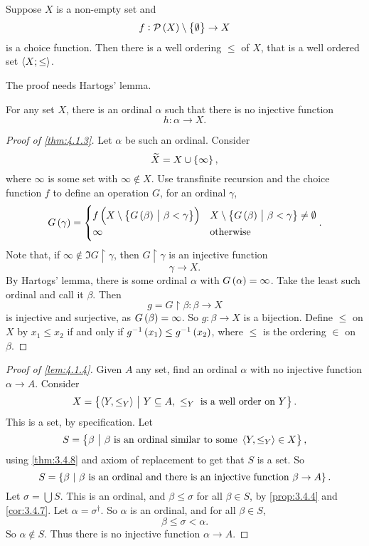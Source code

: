 \begin{theorem}
\label{thm:4.1.3}
Suppose $ X $ is a non-empty set and
$$ f : \PPP\br{X} \setminus \cbr{\emptyset} \to X $$
is a choice function. Then there is a well ordering $ \le $ of $ X $, that is a well ordered set $ \left\langle X; \le \right\rangle $.
\end{theorem}

The proof needs Hartogs' lemma.

\begin{lemma}
\label{lem:4.1.4}
For any set $ X $, there is an ordinal $ \alpha $ such that there is no injective function
$$ h : \alpha \to X. $$
\end{lemma}

\begin{proof}[Proof of \ref{thm:4.1.3}]
Let $ \alpha $ be such an ordinal. Consider
$$ \widetilde{X} = X \cup \cbr{\infty}, $$
where $ \infty $ is some set with $ \infty \notin X $. Use transfinite recursion and the choice function $ f $ to define an operation $ G $, for an ordinal $ \gamma $,
$$ G\br{\gamma} =
\begin{cases}
f\br{X \setminus \cbr{G\br{\beta} \st \beta < \gamma}} & X \setminus \cbr{G\br{\beta} \st \beta < \gamma} \ne \emptyset \\
\infty & \text{otherwise}
\end{cases}.
$$
Note that, if $ \infty \notin \Im G \upharpoonright \gamma $, then $ G \upharpoonright \gamma $ is an injective function
$$ \gamma \to X. $$
By Hartogs' lemma, there is some ordinal $ \alpha $ with $ G\br{\alpha} = \infty $. Take the least such ordinal and call it $ \beta $. Then
$$ g = G \upharpoonright \beta : \beta \to X $$
is injective and surjective, as $ G\br{\beta} = \infty $. So $ g : \beta \to X $ is a bijection. Define $ \le $ on $ X $ by $ x_1 \le x_2 $ if and only if $ g^{-1}\br{x_1} \le g^{-1}\br{x_2} $, where $ \le $ is the ordering $ \in $ on $ \beta $.
\end{proof}

\pagebreak

\begin{proof}[Proof of \ref{lem:4.1.4}]
Given $ A $ any set, find an ordinal $ \alpha $ with no injective function $ \alpha \to A $. Consider
$$ X = \cbr{\abr{Y, \le_Y} \st Y \subseteq A, \ \le_Y \ \text{is a well order on} \ Y}. $$
This is a set, by specification. Let
$$ S = \cbr{\beta \st \beta \ \text{is an ordinal similar to some} \ \abr{Y, \le_Y} \in X}, $$
using \ref{thm:3.4.8} and axiom of replacement to get that $ S $ is a set. So
$$ S = \cbr{\beta \st \beta \ \text{is an ordinal and there is an injective function} \ \beta \to A}. $$
Let $ \sigma = \bigcup S $. This is an ordinal, and $ \beta \le \sigma $ for all $ \beta \in S $, by \ref{prop:3.4.4} and \ref{cor:3.4.7}. Let $ \alpha = \sigma^\dagger $. So $ \alpha $ is an ordinal, and for all $ \beta \in S $,
$$ \beta \le \sigma < \alpha. $$
So $ \alpha \notin S $. Thus there is no injective function $ \alpha \to A $.
\end{proof}

